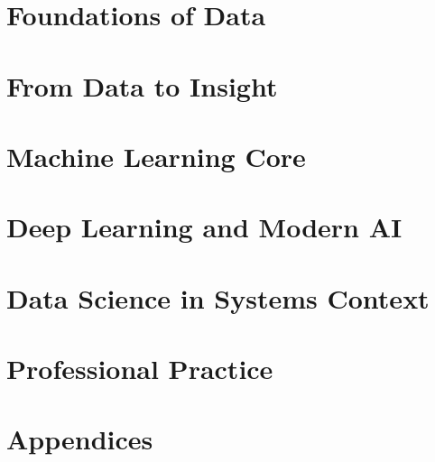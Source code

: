 \documentclass[11pt,a4paper,oneside]{report}
\begin{document}


\part{Foundations of Data}








\part{From Data to Insight}






\part{Machine Learning Core}








\part{Deep Learning and Modern AI}








\part{Data Science in Systems Context}







\part{Professional Practice}







\appendix
\part*{Appendices}







\end{document}
